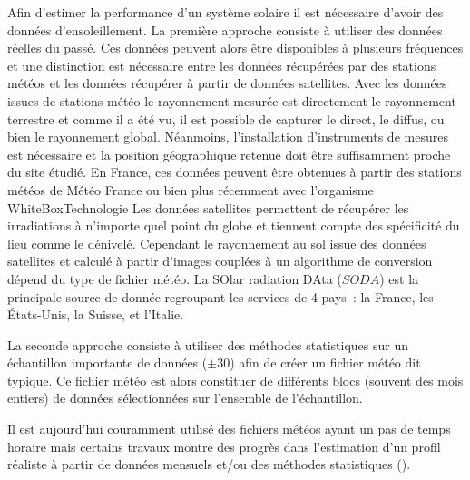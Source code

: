 Afin d’estimer la performance d’un système solaire il est nécessaire d’avoir des
données d’ensoleillement. La première approche consiste à utiliser des données réelles
du passé. Ces données peuvent alors être disponibles à plusieurs fréquences et
une distinction est nécessaire entre les données récupérées par des stations météos et les
données récupérer à partir de données satellites. Avec les données issues de stations météo
le rayonnement mesurée est directement le rayonnement
terrestre et comme il a été vu, il est possible de capturer le direct,
le diffus, ou bien le rayonnement global. Néanmoins, l’installation d’instruments de mesures est nécessaire et
la position géographique retenue doit être suffisamment proche du site étudié.
En France, ces données peuvent être obtenues à partir des stations météos de
Météo France ou bien plus récemment avec l’organisme WhiteBoxTechnologie 
Les données satellites permettent de récupérer les irradiations à n’importe quel
point du globe et tiennent compte des spécificité du lieu comme le dénivelé. Cependant
le rayonnement au sol issue des données satellites et calculé à partir d’images couplées
à un algorithme de conversion dépend du type de fichier météo.
La SOlar radiation DAta ($SODA$) est la principale source de donnée regroupant les
services de 4 pays~: la France, les États-Unis, la Suisse, et l’Italie.

La seconde approche consiste à utiliser des méthodes statistiques sur un échantillon
importante de données ($\pm 30$) afin de créer un fichier météo dit typique. Ce fichier
météo est alors constituer de différents blocs (souvent des mois entiers) de données
sélectionnées sur l’ensemble de l’échantillon.


Il est aujourd’hui couramment utilisé des fichiers météos
ayant un pas de temps horaire mais certains travaux montre des progrès dans l’estimation
d’un profil réaliste à partir de données mensuels et/ou des méthodes statistiques
().







